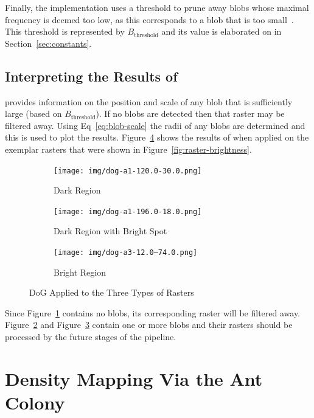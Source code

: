 Finally, the implementation uses a threshold to prune away blobs whose maximal frequency is deemed too low, as this corresponds to a blob that is too small~\cite{scikit-learn}. This threshold is represented by $B_{\text{threshold}}$ and its value is elaborated on in Section~\ref{sec:constants}.

\subsection{Interpreting the Results of \blobdog{}}
\blobdog{} provides information on the position and scale of any blob that is sufficiently large (based on $B_{\text{threshold}}$). If no blobs are detected then that raster may be filtered away. Using Eq\textrm{~}\eqref{eq:blob-scale} the radii of any blobs are determined and this is used to plot the results. Figure~\ref{fig:dog-raster} shows the results of \blobdog{} when applied on the exemplar rasters that were shown in Figure~\ref{fig:raster-brightness}.
\begin{figure}[H]
    \centering
    \begin{subfigure}[b]{0.31\textwidth}
        \texttt{[image: img/dog-a1-120.0-30.0.png]}
        \caption{\label{fig:dog-dark-region}Dark Region}
    \end{subfigure}
    \hspace{0.02\textwidth}
    \begin{subfigure}[b]{0.31\textwidth}
        \texttt{[image: img/dog-a1-196.0-18.0.png]}
        \caption{\label{fig:dog-one-blob}Dark Region with Bright Spot}
    \end{subfigure}
    \hspace{0.02\textwidth}
    \begin{subfigure}[b]{0.31\textwidth}
        \texttt{[image: img/dog-a3-12.0--74.0.png]}
        \caption{\label{fig:dog-bright-region}Bright Region}
    \end{subfigure}
    \caption{\label{fig:dog-raster} DoG Applied to the Three Types of Rasters}
\end{figure}
\vspace{-1.5em}
Since Figure~\ref{fig:dog-dark-region} contains no blobs, its corresponding raster will be filtered away. Figure~\ref{fig:dog-one-blob} and Figure~\ref{fig:dog-bright-region} contain one or more blobs and their rasters should be processed by the future stages of the pipeline.
\newpage{}
\section{\label{sec:Ant}Density Mapping Via the Ant Colony}

